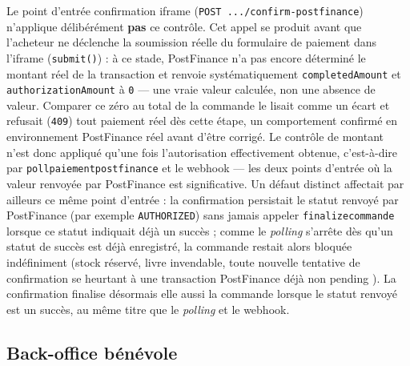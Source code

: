 \documentclass[12pt, a4paper]{report}
\renewcommand{\_}{\origunderscore\allowbreak}
\begin{document}
\noindent Le point d'entrée \og confirmation iframe \fg{} (\texttt{POST .../confirm-postfinance}) n'applique délibérément \textbf{pas} ce contrôle. Cet appel se produit avant que l'acheteur ne déclenche la soumission réelle du formulaire de paiement dans l'iframe (\texttt{submit()}) : à ce stade, PostFinance n'a pas encore déterminé le montant réel de la transaction et renvoie systématiquement \texttt{completedAmount} et \texttt{authorizationAmount} à \texttt{0} — une vraie valeur calculée, non une absence de valeur. Comparer ce zéro au total de la commande le lisait comme un écart et refusait (\texttt{409}) tout paiement réel dès cette étape, un comportement confirmé en environnement PostFinance réel avant d'être corrigé. Le contrôle de montant n'est donc appliqué qu'une fois l'autorisation effectivement obtenue, c'est-à-dire par \texttt{poll\_paiement\_postfinance} et le webhook — les deux points d'entrée où la valeur renvoyée par PostFinance est significative. Un défaut distinct affectait par ailleurs ce même point d'entrée : la confirmation persistait le statut renvoyé par PostFinance (par exemple \texttt{AUTHORIZED}) sans jamais appeler \texttt{\_finalize\_commande} lorsque ce statut indiquait déjà un succès ; comme le \textit{polling} s'arrête dès qu'un statut de succès est déjà enregistré, la commande restait alors bloquée indéfiniment (stock réservé, livre invendable, toute nouvelle tentative de confirmation se heurtant à une transaction PostFinance déjà non \og pending \fg{}). La confirmation finalise désormais elle aussi la commande lorsque le statut renvoyé est un succès, au même titre que le \textit{polling} et le webhook.

\subsection{Back-office bénévole}
\end{document}
